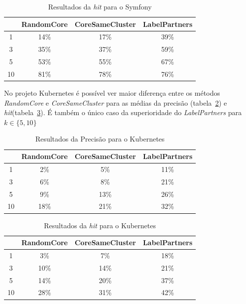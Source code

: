 \documentclass[12pt,openany,oneside,a4paper,english,brazil]{abntbibufjf}
\begin{document}
  \begin{table}[htbp]
  \caption{Resultados da \textit{hit} para o Symfony}
  \begin{center}
  \begin{tabular}{|c|c|c|c|}
  \hline
  \textbf{} & \textbf{RandomCore} & \textbf{CoreSameCluster}& \textbf{LabelPartners} \\
  \hline
  1  & 14\%       & 17\%            & 39\%          \\
  3  & 35\%       & 37\%            & 59\%          \\
  5  & 53\%       & 55\%            & 67\%          \\
  10 & 81\%       & 78\%            & 76\%      \\
  \hline
  \end{tabular}
  \label{tab:hit-symfony}
  \end{center}
  \end{table}

No projeto Kubernetes é possível ver maior diferença entre os métodos \textit{RandomCore} e \textit{CoreSameCluster} para as médias da precisão (tabela~\ref{tab:precision-kubernetes}) e \textit{hit}(tabela~\ref{tab:hit-kubernetes}). É também o único caso da superioridade do \textit{LabelPartners} para $k \in \{5, 10\}$

  \begin{table}[htbp]
  \caption{Resultados da Precisão para o Kubernetes}
  \begin{center}
  \begin{tabular}{|c|c|c|c|}
  \hline
  \textbf{} & \textbf{RandomCore} & \textbf{CoreSameCluster}& \textbf{LabelPartners} \\
  \hline
  1  & 2\%        & 5\%             & 11\%          \\
  3  & 6\%        & 8\%             & 21\%          \\
  5  & 9\%        & 13\%            & 26\%          \\
  10 & 18\%       & 21\%            & 32\%          \\
  \hline
  \end{tabular}
  \label{tab:precision-kubernetes}
  \end{center}
  \end{table}


  \begin{table}[htbp]
  \caption{Resultados da \textit{hit} para o Kubernetes}
  \begin{center}
  \begin{tabular}{|c|c|c|c|}
  \hline
  \textbf{} & \textbf{RandomCore} & \textbf{CoreSameCluster}& \textbf{LabelPartners} \\
  \hline
  1  & 3\%        & 7\%             & 18\%          \\
  3  & 10\%       & 14\%            & 21\%          \\
  5  & 14\%       & 20\%            & 37\%          \\
  10 & 28\%       & 31\%            & 42\%          \\
  \hline
  \end{tabular}
  \label{tab:hit-kubernetes}
  \end{center}
  \end{table}
\end{document}
